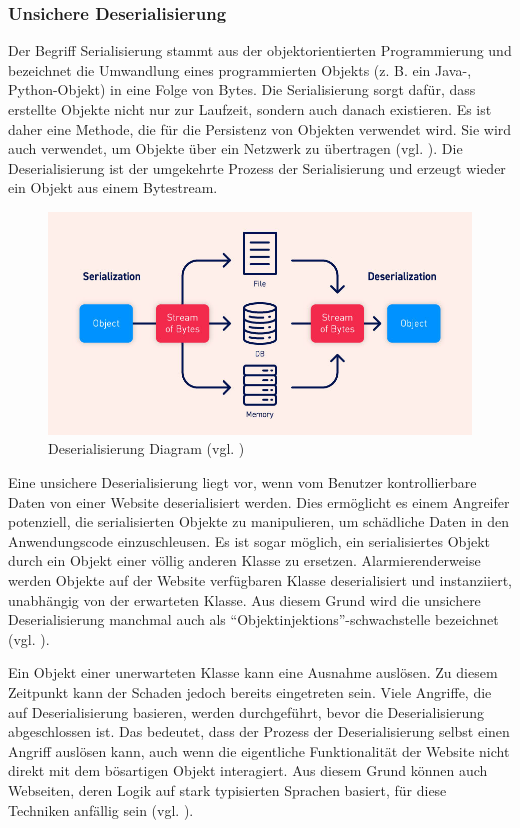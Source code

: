 \subsubsection{Unsichere Deserialisierung}

Der Begriff Serialisierung stammt aus der objektorientierten
Programmierung und bezeichnet die Umwandlung eines programmierten
Objekts (z. B. ein Java-, Python-Objekt) in eine Folge von Bytes.
Die Serialisierung sorgt dafür, dass erstellte Objekte nicht nur zur
Laufzeit, sondern auch danach existieren. Es ist daher eine Methode,
die für die Persistenz von Objekten verwendet wird. Sie wird auch
verwendet, um Objekte über ein Netzwerk zu übertragen (vgl. \cite{serial}).
Die Deserialisierung ist der umgekehrte Prozess der Serialisierung und
erzeugt wieder ein Objekt aus einem Bytestream.

\begin{figure}[H]
    \centering
    \includegraphics[scale=0.4]{images/deserialization-diagram}
    \caption{Deserialisierung Diagram (vgl. \cite{deserial-img})} \label{fig:des}
\end{figure}

Eine unsichere Deserialisierung liegt vor, wenn vom Benutzer kontrollierbare
Daten von einer Website deserialisiert werden. Dies ermöglicht es einem
Angreifer potenziell, die serialisierten Objekte zu manipulieren, um
schädliche Daten in den Anwendungscode einzuschleusen. Es ist sogar
möglich, ein serialisiertes Objekt durch ein Objekt einer völlig anderen
Klasse zu ersetzen. Alarmierenderweise werden Objekte
auf der Website verfügbaren Klasse deserialisiert und instanziiert,
unabhängig von der erwarteten Klasse. Aus diesem Grund wird die unsichere
Deserialisierung manchmal auch als ``Objektinjektions''-schwachstelle
bezeichnet  (vgl. \cite{deserial-img}).

Ein Objekt einer unerwarteten Klasse kann eine Ausnahme auslösen.
Zu diesem Zeitpunkt kann der Schaden jedoch bereits eingetreten sein.
Viele Angriffe, die auf Deserialisierung basieren, werden durchgeführt,
bevor die Deserialisierung abgeschlossen ist. Das bedeutet, dass der
Prozess der Deserialisierung selbst einen Angriff auslösen kann, auch
wenn die eigentliche Funktionalität der Website nicht direkt mit dem
bösartigen Objekt interagiert. Aus diesem Grund können auch Webseiten,
deren Logik auf stark typisierten Sprachen basiert, für diese Techniken
anfällig sein  (vgl. \cite{deserial-img}).